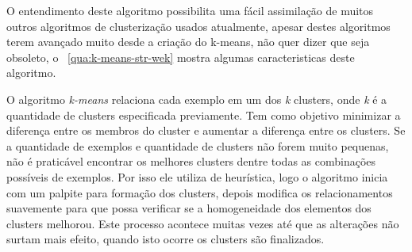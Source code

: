  O entendimento deste algoritmo possibilita uma fácil assimilação de  muitos outros algoritmos de clusterização usados atualmente,
 apesar destes algoritmos terem avançado muito desde a criação do k-means, não quer dizer que seja obsoleto,  
 o ~\autoref{qua:k-means-str-wek} mostra algumas caracteristicas deste algoritmo.

 O algoritmo \textit{k-means} relaciona cada exemplo em um dos \textit{k} clusters, onde \textit{k} é a quantidade de clusters 
 especificada previamente. Tem como objetivo minimizar a diferença entre os membros do cluster e aumentar a diferença entre os clusters.
 Se a quantidade de exemplos e quantidade de clusters não forem muito pequenas, não é praticável encontrar os melhores clusters dentre 
 todas as combinações possíveis de exemplos. Por isso ele utiliza de heurística, logo o algoritmo inicia com um palpite para 
 formação dos clusters, depois modifica os relacionamentos suavemente para que possa verificar se a homogeneidade dos elementos
 dos clusters melhorou. Este processo acontece muitas vezes até que as alterações não surtam mais efeito, quando isto ocorre os
 clusters são finalizados. 
 
 \begin{figure}[ht!]
	\centering
\end{figure}
\begin{figure}[ht!]
	\centering
\end{figure}

